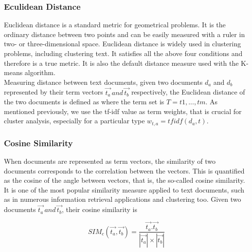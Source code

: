 \subsubsection{Eculidean Distance}
\label {euclidean}
Euclidean distance is a standard metric for geometrical problems. It is the ordinary distance between two points and can be easily measured with a ruler in two- or three-dimensional space. Euclidean distance is widely used in clustering problems, including clustering text. It satisfies all the above four conditions and therefore is a true metric. It is also the default distance measure used with the K-means algorithm.\\
Measuring distance between text documents, given two documents $d_{a}$ and  $d_{b}$ represented by their term vectors  $\overrightarrow{t_{a}} \,and\, \overrightarrow{t_{b}}$ respectively, the Euclidean distance of the two documents is defined as
where the term set is $T = {t1 , . . . , tm }$. As mentioned previously, we use the tf-idf value as term weights, that is
crucial for cluster analysis, especially for a particular type $w_{t,a} = tf idf (d_{a} , t)$.

\subsubsection{Cosine Similarity}
\label {cosine}
When documents are represented as term vectors, the similarity of two documents corresponds to the correlation between the vectors. This is quantified as the cosine of the angle between vectors, that is, the so-called cosine similarity. It is one of the most popular similarity measure applied to text documents, such as in numerous information retrieval applications and clustering too.
Given two documents $\overrightarrow{t_{a}} \,and\, \overrightarrow{t_{b}}$, their cosine similarity is

\begin{equation}
SIM_{c}(\vec{t_{a}},\vec{t_{b}}) =\frac{\vec{t_{a}}.\vec{t_{b}}}{|\vec{t_{a}}|\times|\vec{t_{b}}|}
\end{equation}


